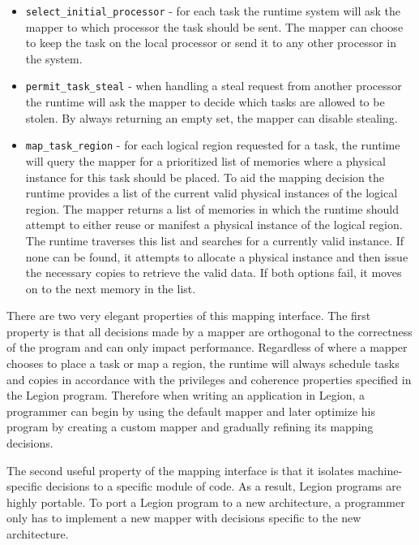 \begin{itemize}
\item {\tt select\_initial\_processor} - for each task the runtime system will
ask the mapper to which processor the task should be sent.  The mapper 
can choose to keep the task on the local processor or send it to any other processor
in the system.

\item {\tt permit\_task\_steal} - when handling a steal request from another processor
the runtime will ask the mapper to decide which tasks are allowed to be stolen.  
By always returning an empty set, the mapper can disable stealing.

\item {\tt map\_task\_region} - for each logical region requested for a task, the
runtime will query the mapper for a prioritized list of memories where a physical instance for this
task should be placed.  To aid the mapping decision the runtime provides a list of the current valid physical instances
of the logical region.  The mapper returns a list of memories in which the runtime
should attempt to either reuse or manifest a physical instance of the logical region.  The
runtime traverses this list and searches for a currently valid instance.  If none can be
found, it attempts to allocate a physical instance and then issue the necessary copies
to retrieve the valid data.  If both options fail, it moves on to the next memory in the list.
\end{itemize}

There are two very elegant properties of this mapping interface.  The first property is
that all decisions made by a mapper are orthogonal to the correctness of the program and can only 
impact performance.  Regardless of where a mapper chooses to place a task or map a region, 
the runtime will always schedule tasks and copies in accordance with the privileges and 
coherence properties specified in the Legion program.  Therefore when writing an application
in Legion, a programmer can begin by using the default mapper and later optimize his program
by creating a custom mapper and gradually refining its mapping decisions.

The second useful property of the mapping interface is that it isolates machine-specific decisions
to a specific module of code.  As a result, Legion programs are highly
portable.  To port a Legion program to a new architecture, a programmer only has to
implement a new mapper with decisions specific to the new architecture. 

